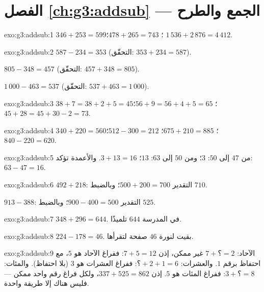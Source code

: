 \section*{الفصل \ref{ch:g3:addsub} --- الجمع والطرح}

\begin{solution}{exo:g3:addsub:1}
$346 + 253 = 599$؛ \quad
$478 + 265 = 743$؛ \quad
$1\,536 + 2\,876 = 4\,412$.
\end{solution}

\begin{solution}{exo:g3:addsub:2}
$587 - 234 = 353$ (التحقّق: $353 + 234 = 587$).

$805 - 348 = 457$ (التحقّق: $457 + 348 = 805$).

$1\,000 - 463 = 537$ (التحقّق: $537 + 463 = 1\,000$).
\end{solution}

\begin{solution}{exo:g3:addsub:3}
$38 + 7 = 38 + 2 + 5 = 45$؛ \quad
$56 + 9 = 56 + 4 + 5 = 65$؛ \quad
$45 + 28 = 45 + 30 - 2 = 73$.
\end{solution}

\begin{solution}{exo:g3:addsub:4}
$340 + 220 = 560$؛ \quad $675 + 210 = 885$؛ \quad
$512 - 300 = 212$؛ \quad $840 - 220 = 620$.
\end{solution}

\begin{solution}{exo:g3:addsub:5}
من $47$ إلى $50$: $3$؛ ومن $50$ إلى $63$: $13$؛ 
$3 + 13 = 16$. والأعمدة تؤكد: $63 - 47 = 16$.
\end{solution}

\begin{solution}{exo:g3:addsub:6}
$492 + 218$: التقدير $500 + 200 = 700$؛ وبالضبط $710$.

$913 - 388$: التقدير $900 - 400 = 500$؛ وبالضبط $525$.
\end{solution}

\begin{solution}{exo:g3:addsub:7}
$348 + 296 = 644$. في المدرسة $644$ تلميذًا.
\end{solution}

\begin{solution}{exo:g3:addsub:8}
$224 - 178 = 46$. بقيت لنورة $46$ صفحة لتقرأها.
\end{solution}

\begin{solution}{exo:g3:addsub:9}
الآحاد: $7 + \text{؟} = 2$ غير ممكن، إذن $7 + 5 = 12$: ففراغ
الآحاد هو $5$، مع احتفاظ برقم $1$. والعشرات: $\text{؟} + 2 + 1 = 6$:
ففراغ العشرات هو $3$ (بلا احتفاظ). والمئات: $3 + \text{؟} = 8$:
ففراغ المئات هو $5$. إذن $337 + 525 = 862$، ولكل فراغ رقم واحد
ممكن --- فليس هناك إلا طريقة واحدة.
\end{solution}

